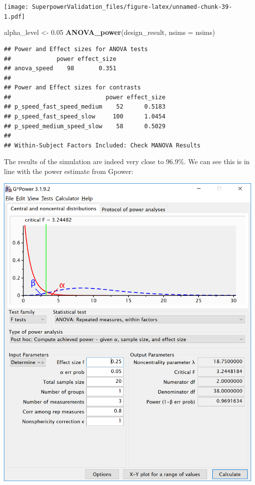 \documentclass[]{book}
\newenvironment{Shaded}{\begin{snugshade}}{\end{snugshade}}
\newcommand{\DataTypeTok}[1]{\textcolor[rgb]{0.13,0.29,0.53}{#1}}
\newcommand{\FloatTok}[1]{\textcolor[rgb]{0.00,0.00,0.81}{#1}}
\newcommand{\KeywordTok}[1]{\textcolor[rgb]{0.13,0.29,0.53}{\textbf{#1}}}
\newcommand{\NormalTok}[1]{#1}
\newcommand{\StringTok}[1]{\textcolor[rgb]{0.31,0.60,0.02}{#1}}
\begin{document}
\texttt{[image: SuperpowerValidation\_files/figure-latex/unnamed-chunk-39-1.pdf]}

\begin{Shaded}
\begin{Highlighting}[]
\NormalTok{alpha_level <-}\StringTok{ }\FloatTok{0.05}
\KeywordTok{ANOVA_power}\NormalTok{(design_result, }\DataTypeTok{nsims =}\NormalTok{ nsims)}
\end{Highlighting}
\end{Shaded}

\begin{verbatim}
## Power and Effect sizes for ANOVA tests
##             power effect_size
## anova_speed    98       0.351
## 
## Power and Effect sizes for contrasts
##                           power effect_size
## p_speed_fast_speed_medium    52      0.5183
## p_speed_fast_speed_slow     100      1.0454
## p_speed_medium_speed_slow    58      0.5029
## 
## Within-Subject Factors Included: Check MANOVA Results
\end{verbatim}

The results of the simulation are indeed very close to 96.9\%. We can see this is in line with the power estimate from Gpower:

\includegraphics{screenshots/gpower_12.png}
\end{document}
